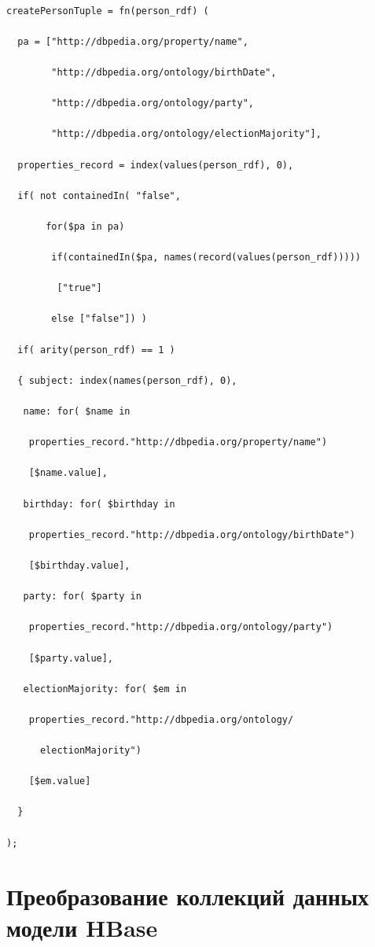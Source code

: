       \begin{verbatim}

createPersonTuple = fn(person_rdf) (

  pa = ["http://dbpedia.org/property/name",

        "http://dbpedia.org/ontology/birthDate",

        "http://dbpedia.org/ontology/party",

        "http://dbpedia.org/ontology/electionMajority"],

  properties_record = index(values(person_rdf), 0),

  if( not containedIn( "false",

       for($pa in pa)	

        if(containedIn($pa, names(record(values(person_rdf)))))

         ["true"]

        else ["false"]) )

  if( arity(person_rdf) == 1 )

  { subject: index(names(person_rdf), 0),

   name: for( $name in

    properties_record."http://dbpedia.org/property/name")

    [$name.value],

   birthday: for( $birthday in

    properties_record."http://dbpedia.org/ontology/birthDate")

    [$birthday.value],

   party: for( $party in

    properties_record."http://dbpedia.org/ontology/party")

    [$party.value],

   electionMajority: for( $em in

    properties_record."http://dbpedia.org/ontology/

      electionMajority")

    [$em.value]

  }

);

\end{verbatim}



\vspace*{4pt}



\section{Преобразование коллекций данных модели HBase}







